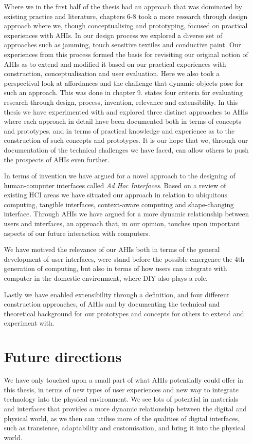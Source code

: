 Where we in the first half of the thesis had an approach that was dominated by existing practice and literature, chapters 6-8 took a more research through design approach where we, though conceptualising and prototyping, focused on practical experiences with AHIs.
In our design process we explored a diverse set of approaches such as jamming, touch sensitive textiles and conductive paint.
Our experiences from this process formed the basis for revisiting our original notion of AHIs as to extend and modified it based on our practical experiences with construction, conceptualisation and user evaluation.
Here we also took a perspectival look at affordances and the challenge that dynamic objects pose for such an approach.
This was done in chapter 9.
\blank
\citet{zimmerman2007research} states four criteria for evaluating research through design, process, invention, relevance and extensibility.
In this thesis we have experimented with and explored three distinct approaches to AHIs where each approach in detail have been documented both in terms of concepts and prototypes, and in terms of practical knowledge and experience as to the construction of such concepts and prototypes.
It is our hope that we, through our documentation of the technical challenges we have faced, can allow others to push the prospects of AHIs even further.

In terms of invention we have argued for a novel approach to the designing of human-computer interfaces called \emph{Ad Hoc Interfaces}.
Based on a review of existing HCI areas we have situated our approach in relation to ubiquitous computing, tangible interfaces, context-aware computing and shape-changing interface.
Through AHIs we have argued for a more dynamic relationship between users and interfaces, an approach that, in our opinion, touches upon important aspects of our future interaction with computers.

We have motived the relevance of our AHIs both in terms of the general development of user interfaces, were stand before the possible emergence the 4th generation of computing, but also in terms of how users can integrate with computer in the domestic environment, where DIY also plays a role.

Lastly we have enabled extensibility through a definition, and four different construction approaches, of AHIs and by documenting the technical and theoretical background for our prototypes and concepts for others to extend and experiment with.

\section{Future directions}
We have only touched upon a small part of what AHIs potentially could offer in this thesis, in terms of new types of user experiences and new way to integrate technology into the physical environment.
We see lots of potential in materials and interfaces that provides a more dynamic relationship between the digital and physical world, as we then can utilise more of the qualities of digital interfaces, such as transience, adaptability and customisation, and bring it into the physical world.


